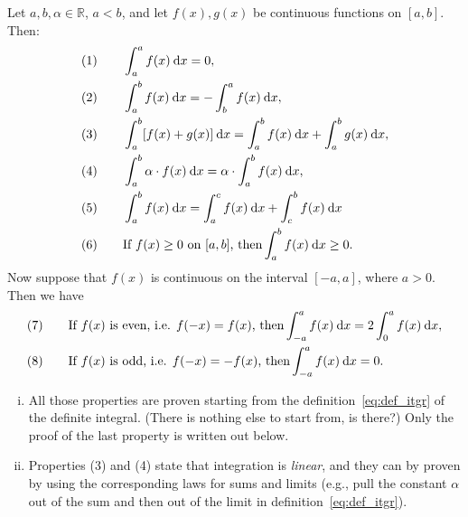 \begin{properties}
\label{prop:di}
Let $a,b,\alpha\in\mathbb{R}$, $a<b$, and let $f(x),g(x)$ be continuous functions on $[a,b]$. Then:
\begin{equation*}
\begin{split}
(1) \qquad & \int_{a}^{a} f(x) \: \mathrm{d} x = 0, \\
(2) \qquad & \int_{a}^{b} f(x) \: \mathrm{d} x = -\int_{b}^{a} f(x) \: \mathrm{d} x, \\
(3) \qquad & \int_{a}^{b} [f(x)+g(x)] \: \mathrm{d} x = \int_{a}^{b} f(x) \: \mathrm{d} x + \int_{a}^{b} g(x) \: \mathrm{d} x, \\
(4) \qquad & \int_{a}^{b} \alpha \cdot f(x) \: \mathrm{d} x = \alpha \cdot \int_{a}^{b} f(x) \: \mathrm{d} x, \\
(5) \qquad & \int_{a}^{b} f(x) \: \mathrm{d} x = \int_{a}^{c} f(x) \: \mathrm{d} x + \int_{c}^{b} f(x) \: \mathrm{d} x  \\
(6) \qquad & \text{If~} f(x) \ge 0 \text{~on~} [a,b] \text{,~then} \int_{a}^{b} f(x) \: \mathrm{d} x \ge 0.
\end{split}
\end{equation*}
Now suppose that $f(x)$ is continuous on the interval $[-a,a]$, where $a>0$. Then we have
\begin{equation*}
\begin{split}
(7) \qquad & \text{If $f(x)$ is even, i.e. $f(-x)=f(x)$, then} 
	\int_{-a}^{a} f(x) \: \mathrm{d} x = 2\int_{0}^{a} f(x) \: \mathrm{d} x, \\
(8) \qquad & \text{If $f(x)$ is odd, i.e. $f(-x)=-f(x)$, then} \int_{-a}^{a} f(x) \: \mathrm{d} x = 0.
\end{split}
\end{equation*}
\end{properties}

\begin{remark}
\begin{enumerate}[(i)]
	\item All those properties are proven starting from the definition~\ref{eq:def_itgr} of the definite integral. (There is nothing else to start from, is there?) Only the proof of the last property is written out below.
	\item Properties (3) and (4) state that integration is \emph{linear}, and they can by proven by using the corresponding laws for sums and limits (e.g., pull the constant $\alpha$ out of the sum and then out of the limit in definition~\ref{eq:def_itgr}).
\end{enumerate}	
\end{remark}

